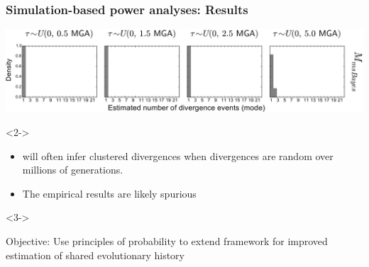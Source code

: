\begin{frame}
    \frametitle{Simulation-based power analyses: Results}
        \centerline{
        \includegraphics[width=1.13\textwidth]{../images/old_old_power_psi_mode.pdf}}

    \begin{uncoverenv}<2->
        \begin{itemize}[<+->]
            \item \msb will often infer clustered divergences when divergences
                are random over millions of generations.

            \item The empirical results are likely spurious
        \end{itemize}
    \end{uncoverenv}

    \begin{uncoverenv}<3->
        \begin{block}{Objective:}
            Use principles of probability to extend \msb framework for improved
            estimation of shared evolutionary history
        \end{block}
    \end{uncoverenv}
\end{frame}



